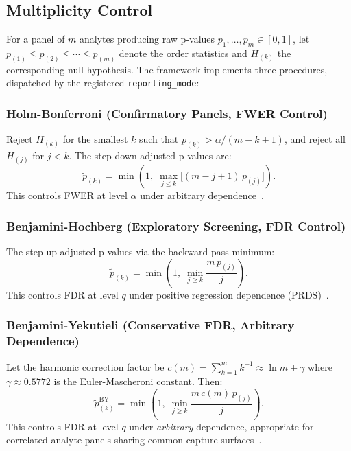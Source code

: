 \documentclass[11pt,a4paper]{article}
\begin{document}
\subsection{Multiplicity Control}
\label{sec:mult}

For a panel of $m$ analytes producing raw p-values $p_1, \ldots, p_m \in [0,1]$,
let $p_{(1)} \le p_{(2)} \le \cdots \le p_{(m)}$ denote the order statistics and
$H_{(k)}$ the corresponding null hypothesis. The framework implements three
procedures, dispatched by the registered \texttt{reporting\_mode}:

\subsubsection{Holm-Bonferroni (Confirmatory Panels, FWER Control)}

Reject $H_{(k)}$ for the smallest $k$ such that $p_{(k)} > \alpha / (m - k + 1)$,
and reject all $H_{(j)}$ for $j < k$. The step-down adjusted p-values are:
\[
  \tilde{p}_{(k)} = \min\!\left(1,\;\max_{j \le k}\bigl[(m - j + 1)\,p_{(j)}\bigr]\right).
\]
This controls FWER at level $\alpha$ under arbitrary dependence~\cite{holm1979}.

\subsubsection{Benjamini-Hochberg (Exploratory Screening, FDR Control)}

The step-up adjusted p-values via the backward-pass minimum:
\[
  \tilde{p}_{(k)} = \min\!\left(1,\;\min_{j \ge k} \frac{m\,p_{(j)}}{j}\right).
  \label{eq:bh}
\]
This controls FDR at level $q$ under positive regression dependence
(PRDS)~\cite{benjamini1995}.

\subsubsection{Benjamini-Yekutieli (Conservative FDR, Arbitrary Dependence)}

Let the harmonic correction factor be $c(m) = \sum_{k=1}^{m} k^{-1} \approx \ln m + \gamma$
where $\gamma \approx 0.5772$ is the Euler-Mascheroni constant. Then:
\[
  \tilde{p}_{(k)}^{\mathrm{BY}} = \min\!\left(1,\;\min_{j \ge k}
  \frac{m\,c(m)\,p_{(j)}}{j}\right).
\]
This controls FDR at level $q$ under \emph{arbitrary} dependence, appropriate
for correlated analyte panels sharing common capture surfaces~\cite{benjamini2001}.
\end{document}
